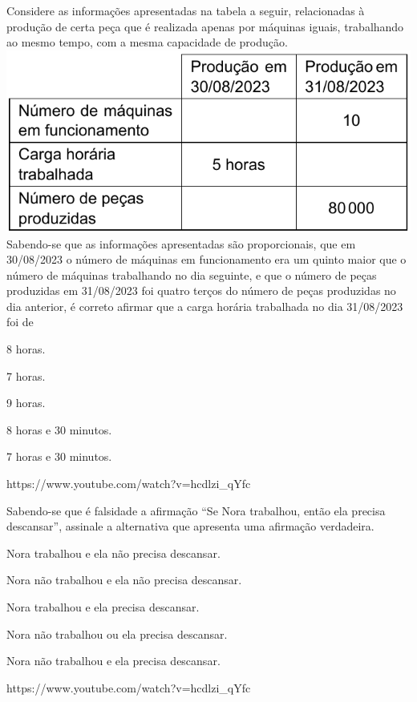 \questao{}
{Considere as informações apresentadas na tabela a seguir, relacionadas à produção de certa peça que é
realizada apenas por máquinas iguais, trabalhando ao mesmo tempo, com a mesma capacidade de produção.\\
\includegraphics[scale=.5]{fig002}\\
Sabendo-se que as informações apresentadas são proporcionais, que em 30/08/2023 o número de máquinas em funcionamento era um quinto maior que o número de máquinas trabalhando no dia seguinte, e que o número de peças produzidas em 31/08/2023 foi quatro terços do número de peças produzidas no dia anterior, é correto afirmar que a carga horária trabalhada no dia 31/08/2023 foi de}
{
\item 8 horas.
\item 7 horas.
\item 9 horas.
\item 8 horas e 30 minutos.
\item 7 horas e 30 minutos.}
{https://www.youtube.com/watch?v=hcdlzi_qYfc}

\questao{}
{Sabendo-se que é falsidade a afirmação “Se Nora trabalhou, então ela precisa descansar”, assinale a alternativa que apresenta uma afirmação verdadeira.
}
{
\item Nora trabalhou e ela não precisa descansar.
\item Nora não trabalhou e ela não precisa descansar.
\item Nora trabalhou e ela precisa descansar.
\item Nora não trabalhou ou ela precisa descansar.
\item Nora não trabalhou e ela precisa descansar.}
{https://www.youtube.com/watch?v=hcdlzi_qYfc}

